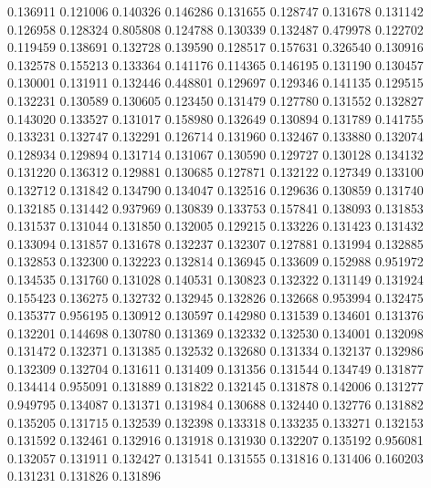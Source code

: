 0.136911
0.121006
0.140326
0.146286
0.131655
0.128747
0.131678
0.131142
0.126958
0.128324
0.805808
0.124788
0.130339
0.132487
0.479978
0.122702
0.119459
0.138691
0.132728
0.139590
0.128517
0.157631
0.326540
0.130916
0.132578
0.155213
0.133364
0.141176
0.114365
0.146195
0.131190
0.130457
0.130001
0.131911
0.132446
0.448801
0.129697
0.129346
0.141135
0.129515
0.132231
0.130589
0.130605
0.123450
0.131479
0.127780
0.131552
0.132827
0.143020
0.133527
0.131017
0.158980
0.132649
0.130894
0.131789
0.141755
0.133231
0.132747
0.132291
0.126714
0.131960
0.132467
0.133880
0.132074
0.128934
0.129894
0.131714
0.131067
0.130590
0.129727
0.130128
0.134132
0.131220
0.136312
0.129881
0.130685
0.127871
0.132122
0.127349
0.133100
0.132712
0.131842
0.134790
0.134047
0.132516
0.129636
0.130859
0.131740
0.132185
0.131442
0.937969
0.130839
0.133753
0.157841
0.138093
0.131853
0.131537
0.131044
0.131850
0.132005
0.129215
0.133226
0.131423
0.131432
0.133094
0.131857
0.131678
0.132237
0.132307
0.127881
0.131994
0.132885
0.132853
0.132300
0.132223
0.132814
0.136945
0.133609
0.152988
0.951972
0.134535
0.131760
0.131028
0.140531
0.130823
0.132322
0.131149
0.131924
0.155423
0.136275
0.132732
0.132945
0.132826
0.132668
0.953994
0.132475
0.135377
0.956195
0.130912
0.130597
0.142980
0.131539
0.134601
0.131376
0.132201
0.144698
0.130780
0.131369
0.132332
0.132530
0.134001
0.132098
0.131472
0.132371
0.131385
0.132532
0.132680
0.131334
0.132137
0.132986
0.132309
0.132704
0.131611
0.131409
0.131356
0.131544
0.134749
0.131877
0.134414
0.955091
0.131889
0.131822
0.132145
0.131878
0.142006
0.131277
0.949795
0.134087
0.131371
0.131984
0.130688
0.132440
0.132776
0.131882
0.135205
0.131715
0.132539
0.132398
0.133318
0.133235
0.133271
0.132153
0.131592
0.132461
0.132916
0.131918
0.131930
0.132207
0.135192
0.956081
0.132057
0.131911
0.132427
0.131541
0.131555
0.131816
0.131406
0.160203
0.131231
0.131826
0.131896
